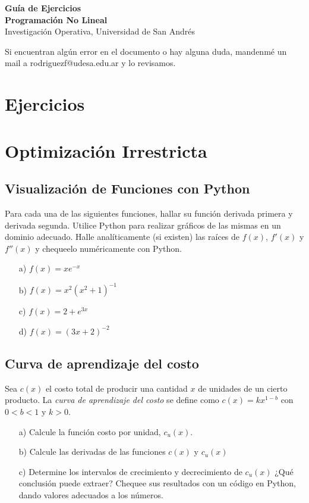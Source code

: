 \documentclass[12pt]{article}
\begin{document}
\begin{center}
    {\LARGE \textbf{Guía de Ejercicios \\Programación No Lineal}}\\[0.5em]
    {Investigación Operativa, Universidad de San Andrés}
\end{center}

Si encuentran algún error en el documento o hay alguna duda, mandenmé un mail a rodriguezf@udesa.edu.ar y lo revisamos.

\section{Ejercicios}

\section*{Optimización Irrestricta}

\subsection{Visualización de Funciones con Python}

Para cada una de las siguientes funciones, hallar su función derivada primera y derivada segunda. Utilice Python para realizar gráficos de las mismas en un dominio adecuado. Halle analíticamente (si existen) las raíces de $f(x)$, $f'(x)$ y $f''(x)$ y chequeelo numéricamente con Python.
\begin{itemize}
    \item[a)] $f(x) = xe^{-x}$
    \item[b)] $f(x) = x^2 (x^2+1)^{-1}$
    \item[c)] $f(x) = 2 + e^{3x}$
    \item[d)] $f(x) = (3x+2)^{-2}$
\end{itemize}

\subsection{Curva de aprendizaje del costo}

Sea $c(x)$ el costo total de producir una cantidad $x$ de unidades de un cierto producto. La \textit{curva de aprendizaje del costo} se define como $c(x) = kx^{1-b}$ con $0 < b < 1$ y $k>0$.
\begin{itemize}
    \item[a)] Calcule la función costo por unidad, $c_u (x)$. 
    \item[b)] Calcule las derivadas de las funciones $c(x)$ y $c_u (x)$
    \item[c)] Determine los intervalos de crecimiento y decrecimiento de $c_u (x)$ ¿Qué conclusión puede extraer? Chequee sus resultados con un código en Python, dando valores adecuados a los números.
\end{itemize}
\end{document}

